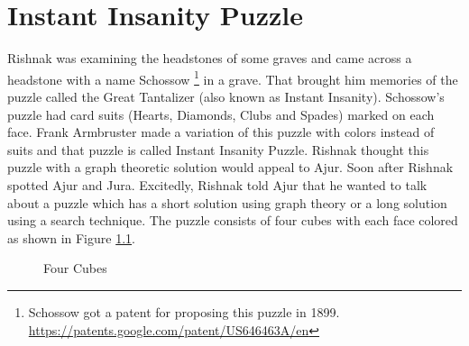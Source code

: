 \chapter{Instant Insanity Puzzle}

Rishnak was examining the headstones of some graves and came across a headstone with a name Schossow \footnote{ Schossow got a patent for proposing this puzzle in 1899. \url{https://patents.google.com/patent/US646463A/en} }  in a grave. That brought him memories of the puzzle called the Great Tantalizer (also known as Instant Insanity). Schossow's puzzle had card suits (Hearts, Diamonds, Clubs and Spades) marked on each face. Frank Armbruster made a variation of this puzzle with colors instead of suits and that puzzle is called Instant Insanity Puzzle.
Rishnak thought this puzzle with a graph theoretic solution would appeal to Ajur. Soon after Rishnak spotted Ajur and Jura. Excitedly, Rishnak told Ajur that he wanted to talk about a puzzle which has a short solution using graph theory or a long solution using a search technique. The puzzle consists of four cubes with each face colored as shown in Figure \ref{22p1}. 
\begin{figure}
\begin{center}
\caption{ Four Cubes}\label{22p1}
\end{center}
\end{figure}

